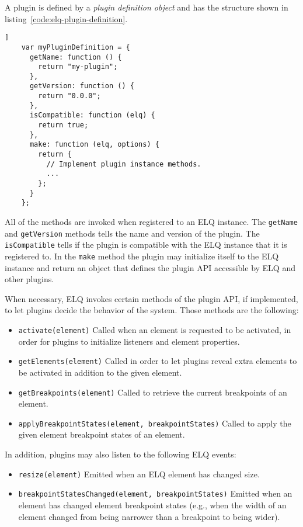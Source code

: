 \documentclass{acm_proc_article-sp}
\newcommand{\code}[1]{\texttt{#1}}
\newcommand{\elq}{ELQ}
\begin{document}
  A plugin is defined by a \emph{plugin definition object} and has the structure shown in listing~\ref{code:elq-plugin-definition}.
  \begin{lstlisting}[gobble=4,caption={The structure of plugin definition objects.},captionpos=b,label={code:elq-plugin-definition}]]
    var myPluginDefinition = {
      getName: function () {
        return "my-plugin";
      },
      getVersion: function () {
        return "0.0.0";
      },
      isCompatible: function (elq) {
        return true;
      },
      make: function (elq, options) {
        return {
          // Implement plugin instance methods.
          ...
        };
      }
    };
  \end{lstlisting}

  All of the methods are invoked when registered to an \elq{} instance.
  The \code{getName} and \code{getVersion} methods tells the name and version of the plugin.
  The \code{isCompatible} tells if the plugin is compatible with the \elq{} instance that it is registered to.
  In the \code{make} method the plugin may initialize itself to the \elq{} instance and return an object that defines the plugin API accessible by \elq{} and other plugins.

  When necessary, \elq{} invokes certain methods of the plugin API, if implemented, to let plugins decide the behavior of the system.
  Those methods are the following:
  \begin{itemize}
    \item \code{activate(element)}
          Called when an element is requested to be activated, in order for plugins to initialize listeners and element properties.
    \item \code{getElements(element)}
          Called in order to let plugins reveal extra elements to be activated in addition to the given element.
    \item \code{getBreakpoints(element)}
          Called to retrieve the current breakpoints of an element.
    \item \code{applyBreakpointStates(element, breakpointStates)}
          Called to apply the given element breakpoint states of an element.
  \end{itemize}

  In addition, plugins may also listen to the following \elq{} events:
  \begin{itemize}
    \item \code{resize(element)}
          Emitted when an \elq{} element has changed size.
    \item \code{breakpointStatesChanged(element, breakpointStates)}
          Emitted when an element has changed element breakpoint states (e.g., when the width of an element changed from being narrower than a breakpoint to being wider).
  \end{itemize}
\end{document}
